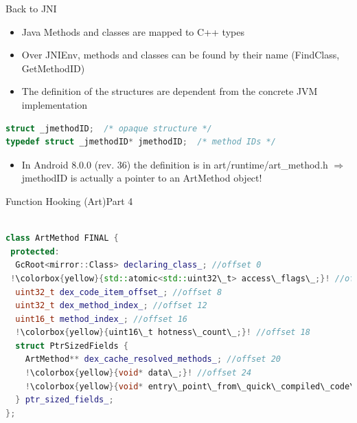 \begin{frame}[fragile]{Back to JNI}

	\begin{itemize}
    	\item Java Methods and classes are mapped to C++ types
    	\item Over JNIEnv, methods and classes can be found by their name (FindClass, GetMethodID)
    	\item The definition of the structures are dependent from the concrete JVM implementation
    \end{itemize}

\begin{lstlisting}[language=C++, style=CppCodeStyle, caption=jmethodID definition in jni.h]
struct _jmethodID;  /* opaque structure */
typedef struct _jmethodID* jmethodID;  /* method IDs */
\end{lstlisting}

	\begin{itemize}
    	\item In Android 8.0.0 (rev. 36) the definition is in art/runtime/art\_method.h \cite{ArtMethodOreoRev36}\newline
    	$\Rightarrow$ jmethodID is actually a pointer to an ArtMethod object!
    \end{itemize}


\end{frame}

\begin{frame}[fragile]{Function Hooking (Art)}{Part 4}

\begin{lstlisting}[language=C++, style=CppCodeStyle, caption=ArtMethod and x86 offsets \cite{ArtMethodOreoRev36},
escapechar=!]
    
class ArtMethod FINAL { 
 protected:
  GcRoot<mirror::Class> declaring_class_; //offset 0
 !\colorbox{yellow}{std::atomic<std::uint32\_t> access\_flags\_;}! //offset 4
  uint32_t dex_code_item_offset_; //offset 8
  uint32_t dex_method_index_; //offset 12
  uint16_t method_index_; //offset 16
  !\colorbox{yellow}{uint16\_t hotness\_count\_;}! //offset 18
  struct PtrSizedFields {
    ArtMethod** dex_cache_resolved_methods_; //offset 20
    !\colorbox{yellow}{void* data\_;}! //offset 24
    !\colorbox{yellow}{void* entry\_point\_from\_quick\_compiled\_code\_;}! //offset 28
  } ptr_sized_fields_;
};
\end{lstlisting}

\end{frame}

